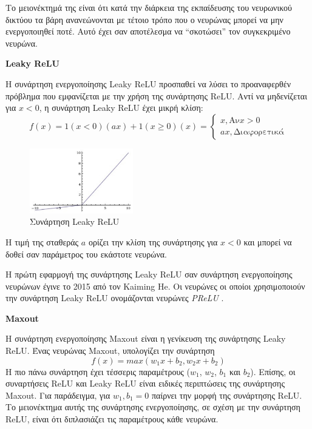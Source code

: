 Το μειονέκτημά της είναι ότι κατά την διάρκεια της εκπαίδευσης του νευρωνικού
δικτύου τα βάρη ανανεώνονται με τέτοιο τρόπο που ο νευρώνας μπορεί να μην ενεργοποιηθεί
ποτέ. Αυτό έχει σαν αποτέλεσμα να “σκοτώσει” τον συγκεκριμένο νευρώνα.

\textbf{Leaky ReLU}

Η συνάρτηση ενεργοποίησης Leaky ReLU προσπαθεί να λύσει το προαναφερθέν
πρόβλημα που εμφανίζεται με την χρήση της συνάρτησης ReLU. Αντί να μηδενίζεται
για $x < 0$, η συνάρτηση Leaky ReLU έχει μικρή κλίση:
\begin{equation*}
  f(x) = 1(x<0)(ax) + 1(x\geq0)(x) =
  \begin{cases}
    x, \text{Αν} x>0 \\
    ax, \text{Διαφορετικά}
  \end{cases}
\end{equation*}

\begin{figure}[!ht]
  \centering
  \includegraphics[width=0.4\textwidth]{./images/chapter3/leaky.png}
  \caption[Συνάρτηση Leaky ReLU]{Συνάρτηση Leaky ReLU}
  \label{fig:leaky}
\end{figure}

Η τιμή της σταθεράς $a$ ορίζει την κλίση της συνάρτησης για $x<0$ και μπορεί να δοθεί
σαν παράμετρος του εκάστοτε νευρώνα.

Η πρώτη εφαρμογή της συνάρτησης
Leaky ReLU σαν συνάρτηση ενεργοποίησης νευρώνων έγινε
το 2015 από τον Kaiming He. Οι νευρώνες οι οποίοι χρησιμοποιούν την
συνάρτηση Leaky ReLU ονομάζονται νευρώνες \emph{PReLU} \cite{DBLP:journals/corr/HeZR015}.

\textbf{Maxout}

Η συνάρτηση ενεργοποίησης Maxout \cite{goodfellow2013maxout} είναι η γενίκευση της συνάρτησης Leaky ReLU.
Ένας νευρώνας Maxout, υπολογίζει την συνάρτηση
\begin{equation*}
  f(x) = max(w_{1}x+b_{2}, w_{2}x+b_{2})
\end{equation*}
Η πιο πάνω συνάρτηση έχει τέσσερις παραμέτρους
($w_{1}$, $w_{2}$, $b_{1}$ και $b_{2}$). Επίσης, οι συναρτήσεις
ReLU και Leaky ReLU είναι ειδικές περιπτώσεις της συνάρτησης Maxout.
Για παράδειγμα, για $w_{1}, b_{1} = 0$ παίρνει την μορφή της συνάρτησης ReLU.
Το μειονέκτημα αυτής της συνάρτησης ενεργοποίησης, σε σχέση με την συνάρτηση
ReLU, είναι ότι διπλασιάζει τις παραμέτρους κάθε νευρώνα.

